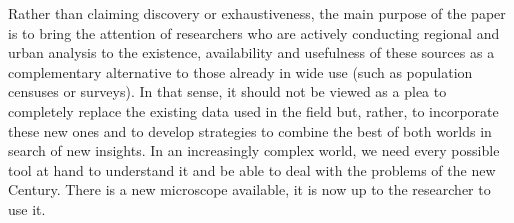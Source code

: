 \documentclass[12pt]{article}
\begin{document}
Rather than claiming discovery or exhaustiveness, the main purpose of the
paper is to bring the attention of researchers who are actively conducting
regional and urban analysis to the existence, availability and usefulness of
these sources as a complementary alternative to those already in wide use
(such as population censuses or surveys). In that sense, it should not be
viewed as a plea to completely replace the existing data used in the field
but, rather, to incorporate these new ones and to
develop strategies to combine the best of both worlds in search of new insights.
%
In an increasingly complex world, we need every possible tool
at hand to understand it and be able to deal with the problems of the new Century.
%
There is a new microscope available, it is now up to the researcher to use it.





\end{document}
